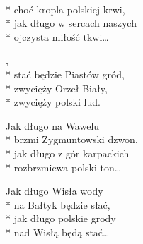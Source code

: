 \begin{lyrics}[longestline={Jak długo w sercach naszych}]

\\*
choć kropla polskiej krwi,\\*
jak długo w sercach naszych\\*
ojczysta miłość tkwi\ldots

\begin{chorus}
,\\*
stać będzie Piastów gród,\\*
zwycięży Orzeł Biały,\\*
zwycięży polski lud.
\end{chorus}

Jak długo na Wawelu\\*
brzmi Zygmuntowski dzwon,\\*
jak długo z gór karpackich\\*
rozbrzmiewa polski ton\ldots

\chorusref

Jak długo Wisła wody\\*
na Bałtyk będzie słać,\\*
jak długo polskie grody\\*
nad Wisłą będą stać\ldots

\chorusref
\end{lyrics}




